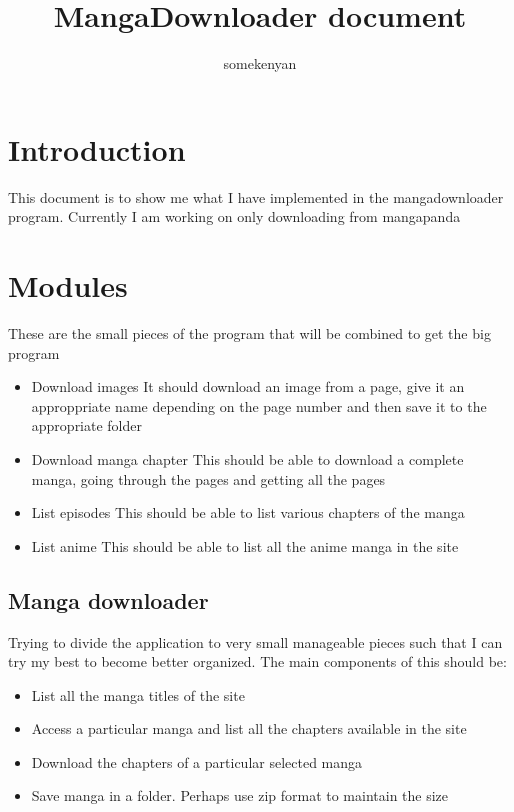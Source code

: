\documentclass{article}
\begin{document}
\author{somekenyan}
\title{MangaDownloader document}
\maketitle

\section{Introduction}

This document is to show me what I have implemented in the mangadownloader program. Currently I am working on only downloading from mangapanda

\section{Modules}
These are the small pieces of the program that will be combined to get the big program

\begin{itemize}
\item Download images
It should download an image from a page, give it an approppriate name depending on the page number and then save it to the appropriate folder
\item Download manga chapter
This should be able to download a complete manga, going through the pages and getting all the pages
\item List episodes
This should be able to list various chapters of the manga
\item List anime
This should be able to list all the anime manga in the site
\end{itemize}

\subsection{Manga downloader}
Trying to divide the application to very small manageable pieces such that I can try my best to become better organized.
The main components of this should be:
\begin{itemize}
\item List all the manga titles of the site
\item Access a particular manga and list all the chapters available in the site
\item Download the chapters of a particular selected manga
\item Save manga in a folder. Perhaps use zip format to maintain the size
\end{itemize}
\end{document}
